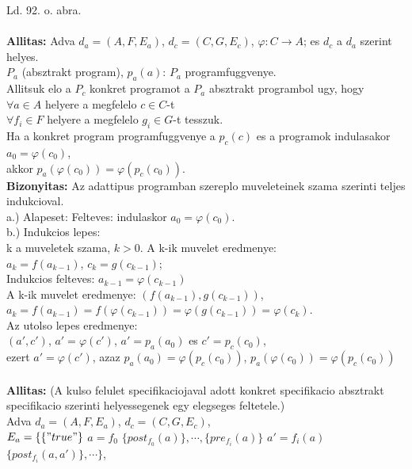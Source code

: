 \documentclass[a4paper,10pt]{article}
\begin{document}
Ld. 92. o. abra.\\ \\
\textbf{Allitas:} Adva $d_a=(A, F, E_a)$, $d_c=(C, G, E_c)$, $\varphi:C\to A$; es $d_c$ a $d_a$ szerint helyes.\\
$P_a$ (absztrakt program), $p_a(a)$: $P_a$ programfuggvenye.\\
Allitsuk elo a $P_c$ konkret programot a $P_a$ absztrakt programbol ugy, hogy\\
\indent $\forall a\in A$ helyere a megfelelo $c\in C$-t\\
\indent $\forall f_i\in F$ helyere a megfelelo $g_i\in G$-t tesszuk.\\
Ha a konkret program programfuggvenye a $p_c(c)$ es a programok indulasakor $a_0=\varphi(c_0)$,\\
akkor $p_a(\varphi(c_0)) = \varphi(p_c(c_0))$.\\
\textbf{Bizonyitas:} Az adattipus programban szereplo muveleteinek szama szerinti teljes indukcioval.\\
a.) Alapeset: Felteves: indulaskor $a_0=\varphi(c_0)$.\\
b.) Indukcios lepes:\\
\indent k a muveletek szama, $k>0$. A k-ik muvelet eredmenye:\\
\indent \indent $a_k=f(a_{k-1})$, $c_k=g(c_{k-1})$;\\
\indent Indukcios felteves: $a_{k-1}=\varphi(c_{k-1})$\\
\indent A k-ik muvelet eredmenye: $(f(a_{k-1}),g(c_{k-1}))$,\\
\indent \indent $a_k=f(a_{k-1})=f(\varphi(c_{k-1}))=\varphi(g(c_{k-1}))=\varphi(c_k)$.\\
Az utolso lepes eredmenye:\\
\indent $(a', c')$, $a'=\varphi(c')$, $a'=p_a(a_0)$ es $c'=p_c(c_0)$,\\
\indent ezert $a'=\varphi(c')$, azaz $p_a(a_0)=\varphi(p_c(c_0))$, $p_a(\varphi(c_0))=\varphi(p_c(c_0))$\\ \\
\textbf{Allitas:} (A kulso felulet specifikaciojaval adott konkret specifikacio absztrakt specifikacio szerinti helyessegenek egy elegseges feltetele.)\\
Adva $d_a=(A, F, E_a)$, $d_c=(C, G, E_c)$,\\
$E_a=\lbrace\lbrace"true"\rbrace$ $a=f_0$ $\lbrace post_{f_0}(a)\rbrace, \cdots, \lbrace pre_{f_i}(a)\rbrace$ $a'=f_i(a)$ $\lbrace post_{f_i}(a, a')\rbrace,\cdots \rbrace$,\\
\end{document}
